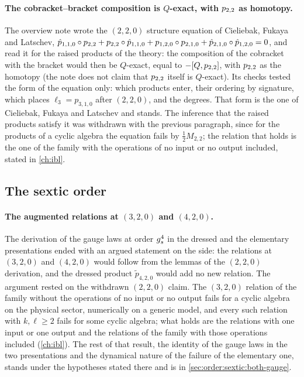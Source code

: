 \paragraph{The cobracket--bracket composition is \texorpdfstring{$Q$}{Q}-exact, with \texorpdfstring{$p_{2,2}$}{p22} as homotopy.}
The overview note wrote the $(2, 2, 0)$ structure equation of Cieliebak, Fukaya and Latschev, $\hat p_{1, 1, 0} \circ p_{2,2} + p_{2,2} \circ \hat p_{1, 1, 0} + p_{1, 2, 0} \circ p_{2, 1, 0} + \hat p_{2, 1, 0} \circ \hat p_{1, 2, 0} = 0$, and read it for the raised products of the theory: the composition of the cobracket with the bracket would then be $Q$-exact, equal to $- [ Q, p_{2,2} ]$, with $p_{2,2}$ as the homotopy (the note does not claim that $p_{2,2}$ itself is $Q$-exact).
Its checks tested the form of the equation only: which products enter, their ordering by signature, which places $\ell_3 = p_{3, 1, 0}$ after $(2, 2, 0)$, and the degrees.
That form is the one of Cieliebak, Fukaya and Latschev and stands.
The inference that the raised products satisfy it was withdrawn with the previous paragraph, since for the products of a cyclic \Loo{} algebra the equation fails by $\tfrac{1}{2} M_{2, 2}$; the relation that holds is the one of the family with the operations of no input or no output included, stated in \cref{ch:ibl}.

\subsection{The sextic order}

\paragraph{The augmented relations at \texorpdfstring{$(3, 2, 0)$}{(3,2,0)} and \texorpdfstring{$(4, 2, 0)$}{(4,2,0)}.}
The derivation of the gauge laws at order $g_s^4$ in the dressed and the elementary presentations ended with an argued statement on the \IBL{} side: the relations at $(3, 2, 0)$ and $(4, 2, 0)$ would follow from the lemmas of the $(2, 2, 0)$ derivation, and the dressed product $\tilde p_{4, 2, 0}$ would add no new relation.
The argument rested on the withdrawn $(2, 2, 0)$ claim.
The $(3, 2, 0)$ relation of the family without the operations of no input or no output fails for a cyclic \Loo{} algebra on the physical sector, numerically on a generic model, and every such relation with $k, \ell \ge 2$ fails for some cyclic \Loo{} algebra; what holds are the relations with one input or one output and the relations of the family with those operations included (\cref{ch:ibl}).
The rest of that result, the identity of the gauge laws in the two presentations and the dynamical nature of the failure of the elementary one, stands under the hypotheses stated there and is in \cref{sec:order:sextic:both-gauge}.


